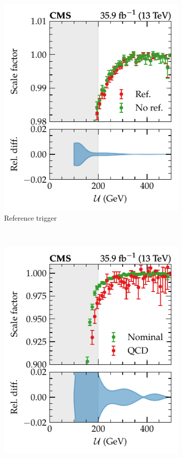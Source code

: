\begin{figure}[htb]
\begin{subfigure}[b]{0.45\textwidth}
        \includegraphics{chapters/041_corrections/images/efficiencies/triggers/met/met_trig_sf_refsyst.pdf}
        \caption{Reference trigger}
        \label{subfigb:ptmiss-trigger-sf}
    \end{subfigure}
    \\
    \begin{subfigure}[b]{0.45\textwidth}
        \centering
        \includegraphics{chapters/041_corrections/images/efficiencies/triggers/met/met_trig_sf_qcdsyst.pdf}

\end{subfigure}
\end{figure}
